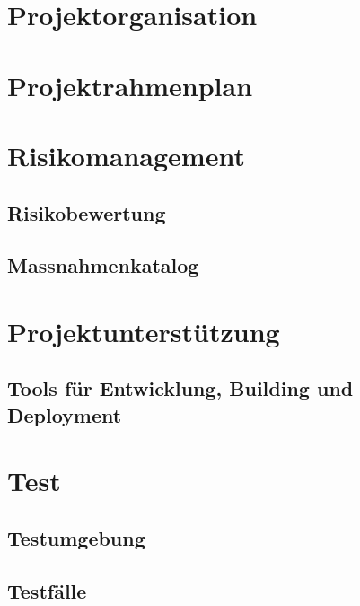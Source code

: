\section{Projektorganisation}

\section{Projektrahmenplan}

\section{Risikomanagement}
    \subsection{Risikobewertung}
    \subsection{Massnahmenkatalog}
    
\section{Projektunterstützung}
    \subsection{Tools für Entwicklung, Building und Deployment}
    
\section{Test}
	\subsection{Testumgebung}
    \subsection{Testfälle}